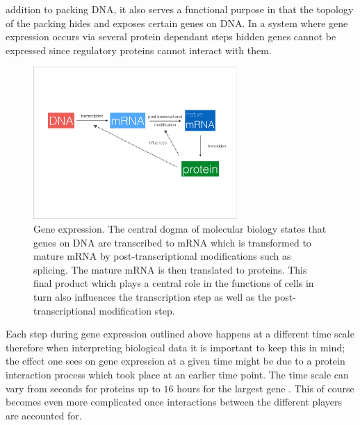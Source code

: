 addition to packing DNA, it also serves a functional purpose in that the topology of the packing hides and exposes certain genes on DNA. In a system where gene expression occurs via several protein dependant steps hidden genes cannot be expressed since regulatory proteins cannot interact with them.

\begin{figure}[!t]
  \centering
  \includegraphics[width=0.69\textwidth]{pics/dogma-bio.pdf}
  \caption{Gene expression. The central dogma of molecular biology states that genes on DNA are transcribed to mRNA which is transformed to mature mRNA by post-transcriptional modifications such as splicing. The mature mRNA is then translated to proteins. This final product which plays a central role in the functions of cells in turn also influences the transcription step as well as the post-transcriptional modification step.}
  \label{fig:gene-expression}
\end{figure}

Each step during gene expression outlined above happens at a different time scale therefore when interpreting biological data it is important to keep this in mind; the effect one sees on gene expression at a given time might be due to a protein interaction process which took place at an earlier time point. The time scale can vary from seconds for proteins \citep{Herce:kq} up to $16$ hours for the largest gene \citep{Tennyson:1995dl}. This of course becomes even more complicated once interactions between the different players are accounted for.

